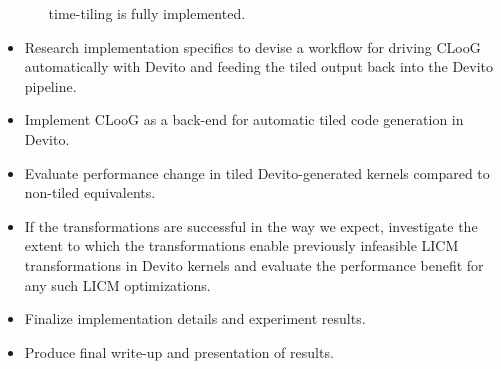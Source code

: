 \documentclass[a4paper,12pt,twoside]{report}
\begin{document}
\begin{itemize}
\begin{itemize}
                time-tiling is fully implemented.
        \end{itemize}
    \item Research implementation specifics to devise a workflow for driving CLooG automatically with Devito and feeding the tiled output back into the Devito pipeline.
    \item Implement CLooG as a back-end for automatic tiled code generation in Devito.
    \item Evaluate performance change in tiled Devito-generated kernels compared to non-tiled equivalents.
    \item If the transformations are successful in the way we expect, investigate the extent to which the transformations enable previously infeasible LICM transformations
        in Devito kernels and evaluate the performance benefit for any such LICM optimizations.
    \item Finalize implementation details and experiment results.
    \item Produce final write-up and presentation of results.
\end{itemize}
\end{document}

